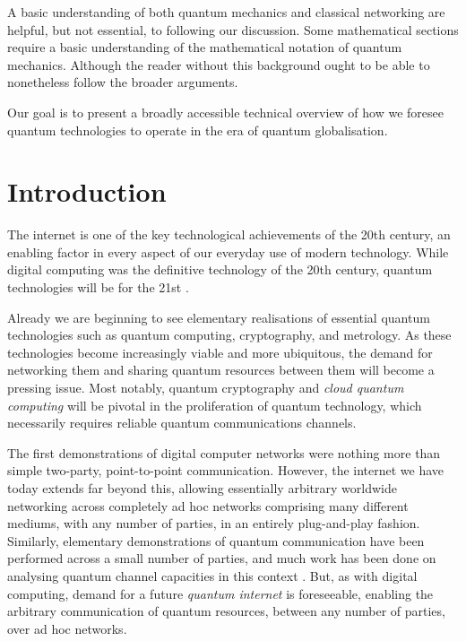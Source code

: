 \documentclass[aps,rmp,twocolumn,amsmath,amssymb,nofootinbib,superscriptaddress]{revtex4}
\begin{document}
A basic understanding of both quantum mechanics and classical networking are helpful, but not essential, to following our discussion. Some mathematical sections require a basic understanding of the mathematical notation of quantum mechanics. Although the reader without this background ought to be able to nonetheless follow the broader arguments.

Our goal is to present a broadly accessible technical overview of how we foresee quantum technologies to operate in the era of quantum globalisation.

%
%

\section{Introduction}

The internet is one of the key technological achievements of the 20th century, an enabling factor in every aspect of our everyday use of modern technology. While digital computing was the definitive technology of the 20th century, quantum technologies will be for the 21st \cite{bib:NielsenChuang00}. 

Already we are beginning to see elementary realisations of essential quantum technologies such as quantum computing, cryptography, and metrology. As these technologies become increasingly viable and more ubiquitous, the demand for networking them and sharing quantum resources between them will become a pressing issue. Most notably, quantum cryptography and \emph{cloud quantum computing} will be pivotal in the proliferation of quantum technology, which necessarily requires reliable quantum communications channels.

The first demonstrations of digital computer networks were nothing more than simple two-party, point-to-point communication. However, the internet we have today extends far beyond this, allowing essentially arbitrary worldwide networking across completely ad hoc networks comprising many different mediums, with any number of parties, in an entirely plug-and-play fashion. Similarly, elementary demonstrations of quantum communication have been performed across a small number of parties, and much work has been done on analysing quantum channel capacities in this context \cite{??? channel_capacity}. But, as with digital computing, demand for a future \emph{quantum internet} is foreseeable, enabling the arbitrary communication of quantum resources, between any number of parties, over ad hoc networks.
\end{document}
